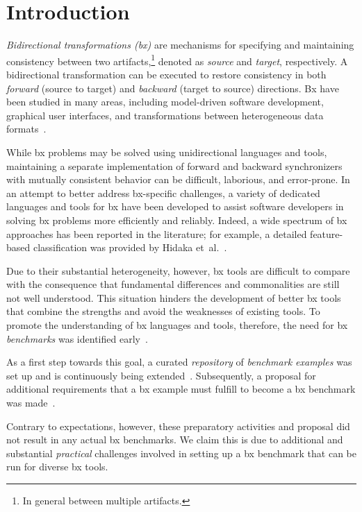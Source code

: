 \section{Introduction}
\label{sec:Introduction}
%

\emph{Bidirectional transformations (bx)} are mechanisms for specifying and maintaining consistency between two artifacts,\footnote{In general between multiple artifacts.} denoted as \emph{source} and \emph{target}, respectively. 
A bidirectional transformation can be executed to restore consistency in both \emph{forward} (source to target) and \emph{backward} (target to source) directions. 
Bx have been studied in many areas, including model-driven software development, graphical user interfaces, and transformations between heterogeneous data formats~\cite{ICMT2009-Czarnecki}.

While bx problems may be solved using unidirectional languages and tools, maintaining a separate implementation of forward and backward synchronizers with mutually consistent behavior can be difficult, laborious, and error-prone. 
In an attempt to better address bx-specific challenges, a variety of dedicated languages and tools for bx have been developed to assist software developers in solving bx problems more efficiently and reliably. 
Indeed, a wide spectrum of bx approaches has been reported in the literature; for example, a detailed feature-based classification was provided by Hidaka et~al.~\cite{SOSYM-Hidaka2016}.

Due to their substantial heterogeneity, however, bx tools are difficult to compare with the consequence that fundamental differences and commonalities are still not well understood.
This situation hinders the development of better bx tools that combine the strengths and avoid the weaknesses of existing tools.
To promote the understanding of bx languages and tools, therefore, the need for bx \emph{benchmarks} was identified early~\cite{ICMT2009-Czarnecki}. 

As a first step towards this goal, a curated \emph{repository} of \emph{benchmark examples} was set up and is continuously being extended~\cite{Cheney2014}.
Subsequently, a proposal for additional requirements that a bx example must fulfill to become a bx benchmark was made~\cite{AnjorinCG0RS14}. 

Contrary to expectations, however, these preparatory activities and proposal did not result in any actual bx benchmarks.
We claim this is due to additional and substantial \emph{practical} challenges involved in setting up a bx benchmark that can be run for  diverse bx tools.

